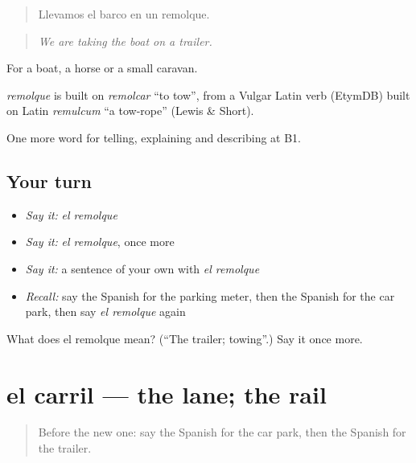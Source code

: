 \begin{quote}
Llevamos el barco en un remolque.
\end{quote}

\begin{quote}
\emph{We are taking the boat on a trailer.}
\end{quote}

For a boat, a horse or a small caravan.

\begin{cousinweb}
\emph{remolque} is built on \emph{remolcar} \textquotedblleft{}to tow\textquotedblright{}, from a Vulgar Latin verb (EtymDB) built on Latin \emph{remulcum} \textquotedblleft{}a tow-rope\textquotedblright{} (Lewis \& Short).
\end{cousinweb}

\begin{grammarlens}[title={What you've built}]
One more word for telling, explaining and describing at B1.
\end{grammarlens}

\subsection*{Your turn}
\begin{itemize}
\raggedright
  \item \emph{Say it:} \emph{el remolque}
  \item \emph{Say it:} \emph{el remolque}, once more
  \item \emph{Say it:} a sentence of your own with \emph{el remolque}
  \item \emph{Recall:} say the Spanish for the parking meter, then the Spanish for the car park, then say \emph{el remolque} again
\end{itemize}

\begin{tcolorbox}[breakable,colback=teal!4,colframe=teal!35!black,title={Before you move on}]
What does el remolque mean? (\textquotedblleft{}The trailer; towing\textquotedblright{}.) Say it once more.
\end{tcolorbox}
\section[el carril]{el carril — the lane; the rail}

\label{lesson:ES-C648-carril}



\begin{quote}
Before the new one: say the Spanish for the car park, then the Spanish for the trailer.
\end{quote}

